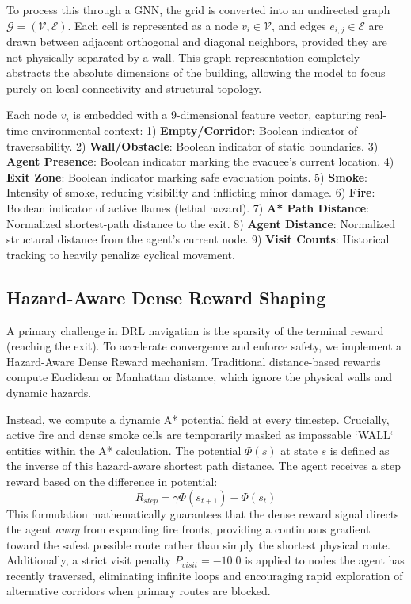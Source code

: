 \documentclass[conference]{IEEEtran}
\begin{document}
To process this through a GNN, the grid is converted into an undirected graph $\mathcal{G} = (\mathcal{V}, \mathcal{E})$. Each cell is represented as a node $v_i \in \mathcal{V}$, and edges $e_{i,j} \in \mathcal{E}$ are drawn between adjacent orthogonal and diagonal neighbors, provided they are not physically separated by a wall. This graph representation completely abstracts the absolute dimensions of the building, allowing the model to focus purely on local connectivity and structural topology.

Each node $v_i$ is embedded with a 9-dimensional feature vector, capturing real-time environmental context:
1) \textbf{Empty/Corridor}: Boolean indicator of traversability.
2) \textbf{Wall/Obstacle}: Boolean indicator of static boundaries.
3) \textbf{Agent Presence}: Boolean indicator marking the evacuee's current location.
4) \textbf{Exit Zone}: Boolean indicator marking safe evacuation points.
5) \textbf{Smoke}: Intensity of smoke, reducing visibility and inflicting minor damage.
6) \textbf{Fire}: Boolean indicator of active flames (lethal hazard).
7) \textbf{A* Path Distance}: Normalized shortest-path distance to the exit.
8) \textbf{Agent Distance}: Normalized structural distance from the agent's current node.
9) \textbf{Visit Counts}: Historical tracking to heavily penalize cyclical movement.

\subsection{Hazard-Aware Dense Reward Shaping}
A primary challenge in DRL navigation is the sparsity of the terminal reward (reaching the exit). To accelerate convergence and enforce safety, we implement a Hazard-Aware Dense Reward mechanism. Traditional distance-based rewards compute Euclidean or Manhattan distance, which ignore the physical walls and dynamic hazards.

Instead, we compute a dynamic A* potential field at every timestep. Crucially, active fire and dense smoke cells are temporarily masked as impassable `WALL` entities within the A* calculation. The potential $\Phi(s)$ at state $s$ is defined as the inverse of this hazard-aware shortest path distance. The agent receives a step reward based on the difference in potential:
\begin{equation}
    R_{step} = \gamma \Phi(s_{t+1}) - \Phi(s_t)
\end{equation}
This formulation mathematically guarantees that the dense reward signal directs the agent \textit{away} from expanding fire fronts, providing a continuous gradient toward the safest possible route rather than simply the shortest physical route. Additionally, a strict visit penalty $P_{visit} = -10.0$ is applied to nodes the agent has recently traversed, eliminating infinite loops and encouraging rapid exploration of alternative corridors when primary routes are blocked.
\end{document}
